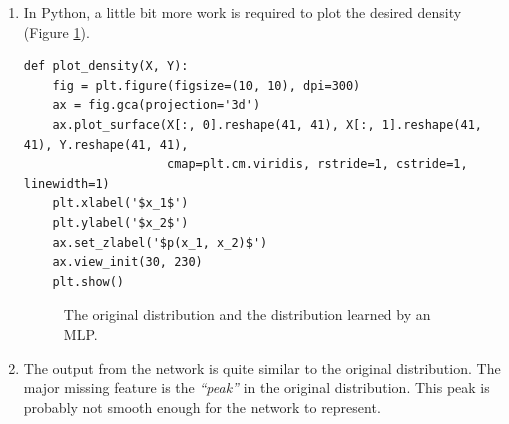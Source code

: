 \documentclass[a4paper]{article}
\begin{document}
\begin{enumerate}
\item In Python, a little bit more work is required to plot the desired density (Figure \ref{fig:mm}).
\begin{lstlisting}
def plot_density(X, Y):
    fig = plt.figure(figsize=(10, 10), dpi=300)
    ax = fig.gca(projection='3d')
    ax.plot_surface(X[:, 0].reshape(41, 41), X[:, 1].reshape(41, 41), Y.reshape(41, 41), 
                    cmap=plt.cm.viridis, rstride=1, cstride=1, linewidth=1)
    plt.xlabel('$x_1$')
    plt.ylabel('$x_2$')
    ax.set_zlabel('$p(x_1, x_2)$')
    ax.view_init(30, 230)
    plt.show()
\end{lstlisting}

\begin{figure}
\centering
{}
\caption{The original distribution and the distribution learned by an MLP.}
\label{fig:mm}
\end{figure}

\item The output from the network is quite similar to the original distribution. The major missing feature is the \emph{``peak''} in the original distribution. This peak is probably not smooth enough for the network to represent.


\end{enumerate}
\end{document}
